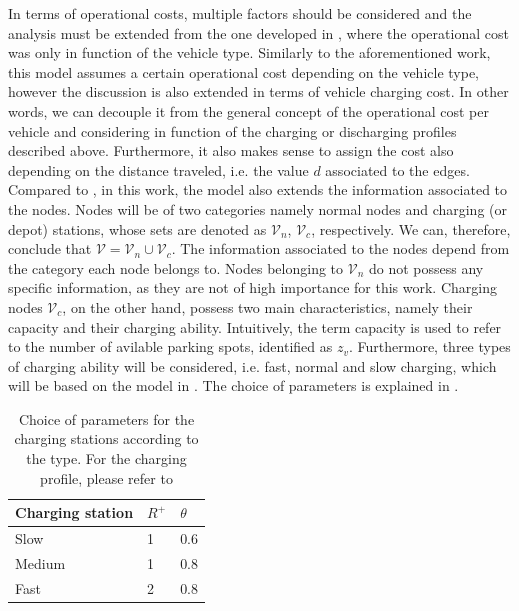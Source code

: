 In terms of operational costs, multiple factors should be considered and the analysis must be extended from the one developed in \cite{project_thesis}, where the operational cost was only in function of the vehicle type. Similarly to the aforementioned work, this model assumes a certain operational cost depending on the vehicle type, however the discussion is also extended in terms of vehicle charging cost. In other words, we can decouple it from the general concept of the operational cost per vehicle and considering in function of the charging or discharging profiles described above. Furthermore, it also makes sense to assign the cost also depending on the distance traveled, i.e. the value $d$ associated to the edges. \\
Compared to \cite{project_thesis}, in this work, the model also extends the information associated to the nodes. Nodes will be of two categories namely normal nodes and charging (or depot) stations, whose sets are denoted as $\mathcal{V}_n$, $\mathcal{V}_c$, respectively. We can, therefore, conclude that $\mathcal{V} = \mathcal{V}_n \cup \mathcal{V}_c$. The information associated to the nodes depend from the category each node belongs to. Nodes belonging to $\mathcal{V}_n$ do not possess any specific information, as they are not of high importance for this work. Charging nodes $\mathcal{V}_c$, on the other hand, possess two main characteristics, namely their capacity and their charging ability. Intuitively, the term capacity is used to refer to the number of avilable parking spots, identified as $z_v$. Furthermore, three types of charging ability will be considered, i.e. fast, normal and slow charging, which will be based on the model in . The choice of parameters is explained in . 
\begin{table}[th]
	\centering
\begin{tabular}{ |p{3cm}|p{3cm}|p{3cm}|  }
	\hline
	Charging station& $R^+$&$\theta$ \\
	\hline
	Slow & 1 &0.6 \\
	Medium & 1   & 0.8 \\
	Fast &2 & 0.8 \\
	\hline
\end{tabular}
	\caption[Parameters choice for the Chargin Stations]{Choice of parameters for the charging stations according to the type. For the charging profile, please refer to }
	\label{tab:charging_stations}	
\end{table}\\

